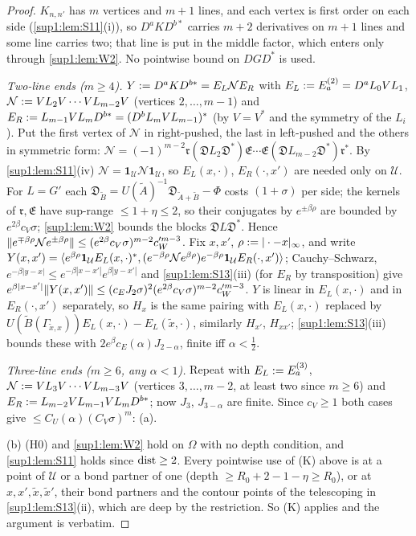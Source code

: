 \begin{proof}
$K_{n,n'}$ has $m$ vertices and $m+1$ lines, and each vertex is first order on each side (\cref{sup1:lem:S11}(i)), so $D^aKD^{b*}$ carries $m+2$ derivatives on $m+1$ lines and some line carries two; that line is put in the middle factor, which enters only through \cref{sup1:lem:W2}. No pointwise bound on $DGD^*$ is used.

\emph{Two-line ends ($m\ge4$).} $Y:= D^aKD^{b*}=E_L\mathcal NE_R$ with $E_L:= E^{(2)}_a=D^aL_0VL_1$, $\mathcal N:= VL_2V\cdots VL_{m-2}V$ (vertices $2,\dots,m-1$) and $E_R:= L_{m-1}VL_mD^{b*}=(D^bL_mVL_{m-1})^*$ (by $V=V^*$ and the symmetry of the $L_i$). Put the first vertex of $\mathcal N$ in right-pushed, the last in left-pushed and the others in symmetric form: $\mathcal N=(-1)^{m-2}\mathfrak r(\mathfrak DL_2\mathfrak D^*)\mathfrak E\cdots\mathfrak E(\mathfrak DL_{m-2}\mathfrak D^*)\mathfrak r^*$. By \cref{sup1:lem:S11}(iv) $\mathcal N=\mathbf 1_{\mathcal U}\mathcal N\mathbf 1_{\mathcal U}$, so $E_L(x,\cdot)$, $E_R(\cdot,x')$ are needed only on $\mathcal U$. For $L=G'$ each $\mathfrak D_{\tilde B}=U(\tilde A)^{-1}\mathfrak D_{\tilde A+\tilde B}-\Phi$ costs $(1+\sigma)$ per side; the kernels of $\mathfrak r,\mathfrak E$ have sup-range $\le1+\eta\le2$, so their conjugates by $e^{\pm\beta\rho}$ are bounded by $e^{2\beta}c_V\sigma$; \cref{sup1:lem:W2} bounds the blocks $\mathfrak DL\mathfrak D^*$. Hence $\lVert e^{\mp\beta\rho}\mathcal Ne^{\pm\beta\rho}\rVert\le(e^{2\beta}c_V\sigma)^{m-2}c_W'^{m-3}$. Fix $x,x'$, $\rho:=|\cdot-x|_\infty$, and write $Y(x,x')=\langle e^{\beta\rho}\mathbf 1_{\mathcal U}E_L(x,\cdot)^*,(e^{-\beta\rho}\mathcal Ne^{\beta\rho})e^{-\beta\rho}\mathbf 1_{\mathcal U}E_R(\cdot,x')\rangle$; Cauchy--Schwarz, $e^{-\beta|y-x|}\le e^{-\beta|x-x'|}e^{\beta|y-x'|}$ and \cref{sup1:lem:S13}(iii) (for $E_R$ by transposition) give $e^{\beta|x-x'|}\lVert Y(x,x')\rVert\le(c_EJ_2\sigma)^2(e^{2\beta}c_V\sigma)^{m-2}c_W'^{m-3}$. $Y$ is linear in $E_L(x,\cdot)$ and in $E_R(\cdot,x')$ separately, so $H_x$ is the same pairing with $E_L(x,\cdot)$ replaced by $U(\tilde B(\Gamma_{\tilde x,x}))E_L(x,\cdot)-E_L(\tilde x,\cdot)$, similarly $H_{x'}$, $H_{xx'}$; \cref{sup1:lem:S13}(iii) bounds these with $2e^\beta c_E(\alpha)J_{2-\alpha}$, finite iff $\alpha<\frac12$.

\emph{Three-line ends ($m\ge6$, any $\alpha<1$).} Repeat with $E_L:= E^{(3)}_a$, $\mathcal N:= VL_3V\cdots VL_{m-3}V$ (vertices $3,\dots,m-2$, at least two since $m\ge6$) and $E_R:= L_{m-2}VL_{m-1}VL_mD^{b*}$; now $J_3$, $J_{3-\alpha}$ are finite. Since $c_V\ge1$ both cases give $\le C_U(\alpha)(C_V\sigma)^m$: (a).

(b) (H0) and \cref{sup1:lem:W2} hold on $\Omega$ with no depth condition, and \cref{sup1:lem:S11} holds since $\operatorname{dist}\ge2$. Every pointwise use of (K) above is at a point of $\mathcal U$ or a bond partner of one (depth $\ge R_0+2-1-\eta\ge R_0$), or at $x,x',\tilde x,\tilde x'$, their bond partners and the contour points of the telescoping in \cref{sup1:lem:S13}(ii), which are deep by the restriction. So (K) applies and the argument is verbatim.
\end{proof}

